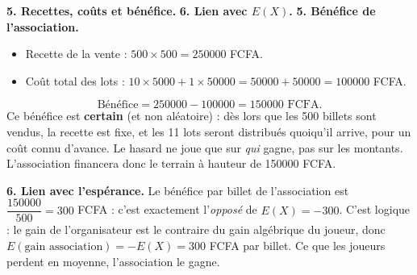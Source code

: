\documentclass[11pt]{article}
\begin{document}
\begin{exoresolu}
\textbf{5. Recettes, coûts et bénéfice.} \textbf{6. Lien avec $E(X)$.}
\tcblower
\textbf{5. Bénéfice de l'association.}
\begin{itemize}
\item Recette de la vente : $500 \times 500 = \num{250000}$ FCFA.
\item Coût total des lots : $10 \times \num{5000} + 1 \times \num{50000} = \num{50000} + \num{50000} = \num{100000}$ FCFA.
\end{itemize}
\[
\text{Bénéfice} = \num{250000} - \num{100000} = \num{150000} \text{ FCFA}.
\]
Ce bénéfice est \textbf{certain} (et non aléatoire) : dès lors que les 500 billets sont vendus, la recette est fixe, et les 11 lots seront distribués quoiqu'il arrive, pour un coût connu d'avance. Le hasard ne joue que sur \emph{qui} gagne, pas sur les montants. L'association financera donc le terrain à hauteur de \num{150000} FCFA.

\textbf{6. Lien avec l'espérance.} Le bénéfice par billet de l'association est $\dfrac{\num{150000}}{500} = 300$ FCFA : c'est exactement l'\emph{opposé} de $E(X) = -300$. C'est logique : le gain de l'organisateur est le contraire du gain algébrique du joueur, donc $E(\text{gain association}) = -E(X) = 300$ FCFA par billet. Ce que les joueurs perdent en moyenne, l'association le gagne.
\end{exoresolu}
\end{document}
